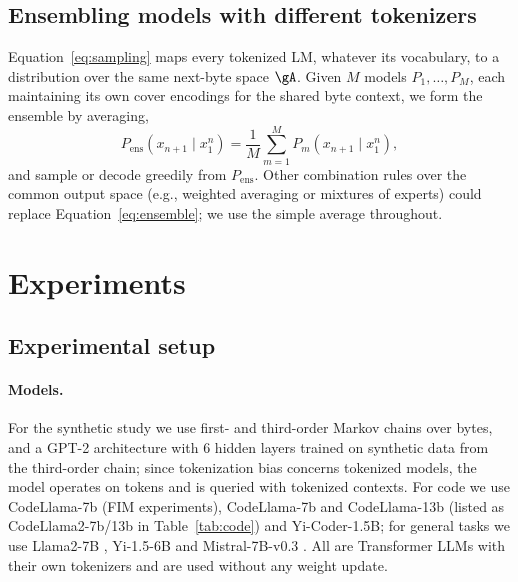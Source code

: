 \documentclass{article} %
\begin{document}
\subsection{Ensembling models with different tokenizers}
\label{sec:ensemble}
Equation~\ref{eq:sampling} maps every tokenized LM, whatever its vocabulary, to a distribution over the same next-byte space $\gA$. Given $M$ models $P_1,\dots,P_M$, each maintaining its own cover encodings for the shared byte context, we form the ensemble by averaging,
\begin{equation}
P_{\mathrm{ens}}(x_{n+1}\mid x_1^n) = \frac{1}{M}\sum_{m=1}^{M} P_m(x_{n+1}\mid x_1^n),
\label{eq:ensemble}
\end{equation}
and sample or decode greedily from $P_{\mathrm{ens}}$. Other combination rules over the common output space (e.g., weighted averaging or mixtures of experts) could replace Equation~\ref{eq:ensemble}; we use the simple average throughout.

\section{Experiments}
\label{sec:experiments}
\subsection{Experimental setup}
\label{sec:exp_setup}
\paragraph{Models.} For the synthetic study we use first- and third-order Markov chains over bytes, and a GPT-2 \citep{radford2019gpt2} architecture with 6 hidden layers trained on synthetic data from the third-order chain; since tokenization bias concerns tokenized models, the model operates on tokens and is queried with tokenized contexts. For code we use CodeLlama-7b (FIM experiments), CodeLlama-7b and CodeLlama-13b (listed as CodeLlama2-7b/13b in Table~\ref{tab:code}) \citep{roziere2023codellama} and Yi-Coder-1.5B; for general tasks we use Llama2-7B \citep{touvron2023llama2}, Yi-1.5-6B \citep{young2024yi} and Mistral-7B-v0.3 \citep{jiang2023mistral}. All are Transformer LLMs with their own tokenizers and are used without any weight update.
\end{document}
